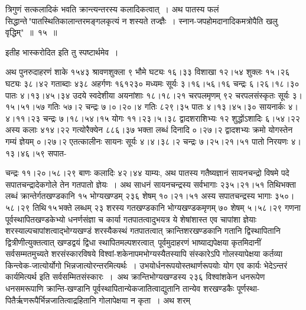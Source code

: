 \documentclass[11pt, openany]{book}
\begin{document}
\begin{sloppypar}
\noindent त्रिगुणं सत्कलादिकं भवति क्रान्त्यन्तरस्य कलादिकत्वात्~। अथ पातस्य फलं {\color{violet}सिद्धान्ते\textendash \,"पातस्थितिकालान्तरमङ्गलकृत्यं न शस्यते तज्ज्ञैः~। स्नान-जपहोमदानादिकमत्रोपैति खलु वृद्धिम्"}~॥~१५~॥

\begin{center}
इतीह भास्करोदित इति तु स्पष्टार्थमेव~।
\end{center}

अथ पुनरुदाहरणं शाके १५४३ श्रावणशुक्ला ९ भौमे घट्यः १६।३३ विशाखा १२।५४ शुक्लः १५।२६ घट्यः ३८।४२ गताब्दाः ४३८ अहर्गणः १६१२३० मध्यमः सूर्यः ३।१६।५६।१६ चन्द्रः ६।२६।१८।३० पातः ४।१३।४५।३४ उदये स्वदेशीया अयनांशाः १८।१८।२१ चरपलमृणम् ९२ चरपलसंस्कृतः सूर्यः ३।१५।५१।५७ गतिः ५७।२ चन्द्रः ७।०।२०।४ गतिः ८२९।३५ पातः ४।१३।४५।३० सायनार्कः ४।४।११।२३ चन्द्रः ७।१८।५४।१५ योगः ११।२३।५।३८ द्वादशराशिभ्यः १२ शुद्धोंऽशादिः ६।५४।२२ अस्य कलाः ४१४।२२ गत्योरैक्येन ८८६।३७ भक्ता लब्धं दिनादि ०।२७।२ द्वादशभ्यः क्रमो योगस्तेन गम्यं ज्ञेयम् ०।२७।२ एतत्कालीनः सायनः सूर्यः ४।४।३८।२ चन्द्रः ७।२५।२१।५१ पातो निरयणः ४।१३।४६।५९ सपात-
\end{sloppypar}

\newpage

\begin{sloppypar}
\noindent चन्द्रः ११।२०।५८।२९ बाणः कलादिः ४२।४४ याम्यः, अथ पातस्य गतैष्यज्ञानं सायनचन्द्रो विषमे पदे सपातचन्द्रादेकगोले तेन गतपातो ज्ञेयः~। अथ साधनं सायनचन्द्रस्य सर्वभागाः २३५।२१।५१ तिथिभक्ता लब्धं क्रान्तेर्गतखण्डकानि १५ भोग्यखण्डम् २३६ शेषम् १०।२१।५१ अस्य सपातचन्द्रस्य भागाः ३५०।५८।२९ तिथि\textendash \,१५\textendash \,भक्ते लब्धम् २३ शरस्य गतखण्डकानि भोग्यखण्डकमृणम् ७० शेषम् ५।५८।२९ गणना पूर्वस्थापितखण्डकेभ्यो धनर्णसंज्ञा च कार्या गतपातत्वादुभयत्र ये शेषांशास्त एव चापांशा ज्ञेयाः शरस्याल्पचापांशत्वाद्भोग्यखण्डं शरस्यैकस्थं गतपातत्वात् क्रान्तिशरखण्डकानि गतानि द्विस्थापितानि द्वित्रीणीत्युक्तत्वात् खण्डद्वयं द्विधा स्थापितमल्पशरत्वात्~पूर्वमुदाहरणं भाष्याद्यपेक्षया कृतमिदानीं सर्वसम्मतमुच्यते शरसंस्कारविषये विश्वां-शकेनापमभोग्यस्यैतस्यापि संस्कारेऽपि गोलस्यापेक्षया कर्तव्या किन्त्वेक-जात्योर्योगो भिन्नजात्योरन्तरमित्यर्थः~। उभयोर्धनरूपयोस्तथार्णरूपयोः योग एव कार्यः भेदेऽन्तरं कार्यमित्यर्थ इति सर्वसम्मितसंस्कारः~।~अथ क्रान्तिभोग्यखण्डस्य २३६ विश्वांशकेन धनरूपेण धनसमरूपाणि क्रान्ति-खण्डानि पूर्वस्थापितान्येकजातित्वाद्युतानि तान्येव शरखण्डकैः पूर्णस्था-पितैर्ऋणरूपैर्भिन्नजातित्वाद्रहितानि गोलापेक्षया न कृता~। अथ शरम्
\end{sloppypar}

\newpage
\end{document}
